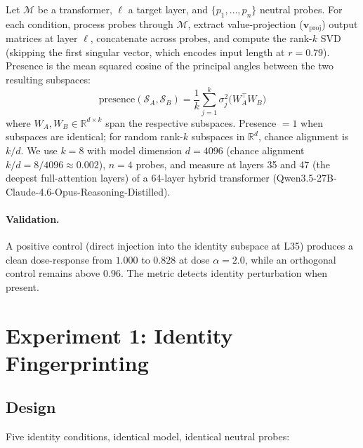 \documentclass[11pt,a4paper]{article}
\begin{document}
Let $\mathcal{M}$ be a transformer, $\ell$ a target layer, and
$\{p_1, \ldots, p_n\}$ neutral probes. For each condition, process probes
through $\mathcal{M}$, extract value-projection ($\mathbf{v}_\text{proj}$) output matrices at
layer $\ell$, concatenate across probes, and compute the rank-$k$ SVD (skipping the
first singular vector, which encodes input length at $r = 0.79$). Presence
is the mean squared cosine of the principal angles between the two
resulting subspaces:
\begin{equation}
\text{presence}(\mathcal{S}_A, \mathcal{S}_B)
  = \frac{1}{k} \sum_{j=1}^{k} \sigma_j^2
    \bigl( W_A^\top W_B \bigr)
\end{equation}
where $W_A, W_B \in \mathbb{R}^{d \times k}$ span the respective
subspaces. Presence $= 1$ when subspaces are identical; for random
rank-$k$ subspaces in $\mathbb{R}^d$, chance alignment is $k/d$. We use
$k = 8$ with model dimension $d = 4096$ (chance alignment
$k/d = 8/4096 \approx 0.002$), $n = 4$ probes, and measure at layers 35
and 47 (the deepest full-attention layers) of a 64-layer hybrid
transformer (Qwen3.5-27B-Claude-4.6-Opus-Reasoning-Distilled).

\paragraph{Validation.} A positive control (direct injection into the
identity subspace at L35) produces a clean dose-response from $1.000$ to
$0.828$ at dose $\alpha = 2.0$, while an orthogonal control remains above
$0.96$. The metric detects identity perturbation when present.

\section{Experiment 1: Identity Fingerprinting}
\label{sec:fingerprint}

\subsection{Design}

Five identity conditions, identical model, identical neutral probes:
\end{document}
